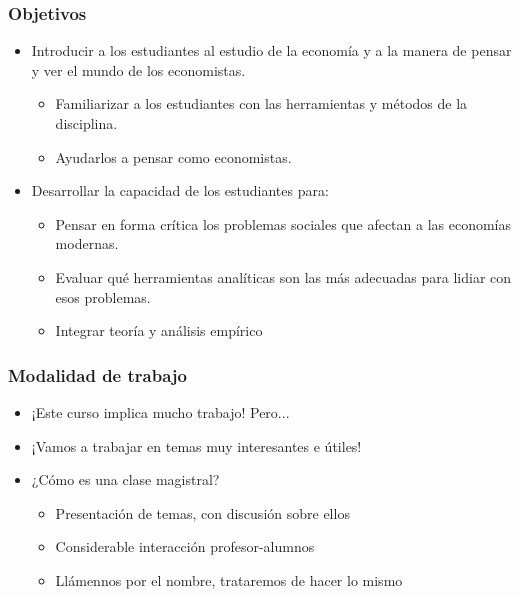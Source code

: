 \documentclass[14pt]{beamer}
\begin{document}
\begin{frame}
\frametitle{Objetivos}
\begin{itemize}
    \item Introducir a los estudiantes al estudio de la economía y a la manera de pensar y ver el mundo de los economistas.
    \begin{itemize}
        \item Familiarizar a los estudiantes con las herramientas y métodos de la disciplina.
        \item Ayudarlos a pensar como economistas. 
    \end{itemize}
\item Desarrollar la capacidad de los estudiantes para:
    \begin{itemize}
        \item Pensar en forma crítica los problemas sociales que afectan a las economías modernas.
        \item Evaluar qué herramientas analíticas son las más adecuadas para lidiar con esos problemas.
        \item Integrar teoría y análisis empírico 
    \end{itemize}    
\end{itemize}
\end{frame}

\begin{frame}
\frametitle{Modalidad de trabajo}
\begin{itemize}
    \item ¡Este curso implica mucho trabajo! Pero...  \vspace{2mm}
    \item ¡Vamos a trabajar en temas muy interesantes e útiles!  \vspace{2mm}
    \item ¿Cómo es una clase magistral? 
        \begin{itemize}
            \item Presentación de temas, con discusión sobre ellos
            \item Considerable interacción profesor-alumnos
            \item Llámennos por el nombre, trataremos de hacer lo mismo
        \end{itemize}
\end{itemize}
\end{frame}
\end{document}
